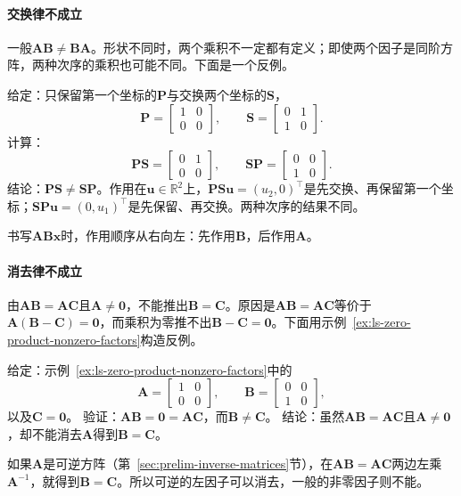 \paragraph{交换律不成立}
一般$\bm A\bm B\neq\bm B\bm A$。形状不同时，两个乘积不一定都有定义；即使两个因子是同阶方阵，两种次序的乘积也可能不同。下面是一个反例。
\begin{example}[反例：先交换再保留与先保留再交换]
\label{ex:ls-noncommuting-pair}
给定：只保留第一个坐标的$\bm P$与交换两个坐标的$\bm S$，
\[
\bm P=\begin{bmatrix}1&0\\0&0\end{bmatrix},\qquad
\bm S=\begin{bmatrix}0&1\\1&0\end{bmatrix}.
\]
计算：
\[
\bm P\bm S=\begin{bmatrix}0&1\\0&0\end{bmatrix},\qquad
\bm S\bm P=\begin{bmatrix}0&0\\1&0\end{bmatrix}.
\]
结论：$\bm P\bm S\neq\bm S\bm P$。作用在$\bm u\in\mathbb R^2$上，$\bm P\bm S\bm u=(u_2,0)^\top$是先交换、再保留第一个坐标；$\bm S\bm P\bm u=(0,u_1)^\top$是先保留、再交换。两种次序的结果不同。
\end{example}
书写$\bm A\bm B\bm x$时，作用顺序从右向左：先作用$\bm B$，后作用$\bm A$。

\paragraph{消去律不成立}
由$\bm A\bm B=\bm A\bm C$且$\bm A\neq\bm0$，不能推出$\bm B=\bm C$。原因是$\bm A\bm B=\bm A\bm C$等价于$\bm A(\bm B-\bm C)=\bm0$，而乘积为零推不出$\bm B-\bm C=\bm0$。下面用示例~\ref{ex:ls-zero-product-nonzero-factors}构造反例。
\begin{example}[反例：非零的左因子不能消去]
\label{ex:ls-cancellation-fails}
给定：示例~\ref{ex:ls-zero-product-nonzero-factors}中的
\[
\bm A=\begin{bmatrix}1&0\\0&0\end{bmatrix},\qquad
\bm B=\begin{bmatrix}0&0\\1&0\end{bmatrix},
\]
以及$\bm C=\bm0$。
验证：$\bm A\bm B=\bm0=\bm A\bm C$，而$\bm B\neq\bm C$。
结论：虽然$\bm A\bm B=\bm A\bm C$且$\bm A\neq\bm0$，却不能消去$\bm A$得到$\bm B=\bm C$。
\end{example}
如果$\bm A$是可逆方阵（第~\ref{sec:prelim-inverse-matrices}节），在$\bm A\bm B=\bm A\bm C$两边左乘$\bm A^{-1}$，就得到$\bm B=\bm C$。所以可逆的左因子可以消去，一般的非零因子则不能。


